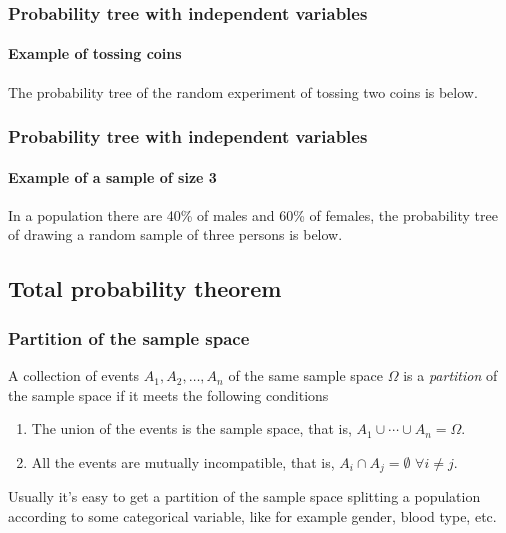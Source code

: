 \begin{frame}
\frametitle{Probability tree with independent variables}
\framesubtitle{Example of tossing coins}
The probability tree of the random experiment of tossing two coins is below.
\begin{center}
\resizebox{0.8\textwidth}{!}{}
\end{center}
\end{frame}


\begin{frame}
\frametitle{Probability tree with independent variables}
\framesubtitle{Example of a sample of size 3}
In a population there are 40\% of males and 60\% of females, the probability tree of drawing a random sample of three
persons is below.
\begin{center}
\resizebox{0.9\textwidth}{!}{}
\end{center}
\end{frame}


\subsection{Total probability theorem}

\begin{frame}
\frametitle{Partition of the sample space}
\begin{definition}
A collection of events $A_1,A_2,\ldots,A_n$ of the same sample space $\Omega$ is a \emph{partition} of the sample space
if it meets the following conditions
\begin{enumerate}
\item The union of the events is the sample space, that is, $A_1\cup \cdots\cup A_n =\Omega$.
\item All the events are mutually incompatible, that is, $A_i\cap A_j = \emptyset$ $\forall i\neq j$.
\end{enumerate}
\end{definition}

\begin{center}

\end{center}

Usually it's easy to get a partition of the sample space splitting a population according to some categorical variable,
like for example gender, blood type, etc.
\end{frame}


